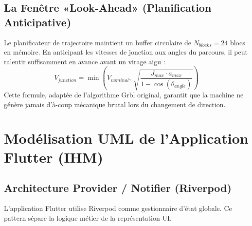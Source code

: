 \subsection{La Fenêtre «Look-Ahead» (Planification Anticipative)}
Le planificateur de trajectoire maintient un buffer circulaire de $N_{blocks} = 24$ blocs en mémoire. En anticipant les vitesses de jonction aux angles du parcours, il peut ralentir suffisamment en avance avant un virage aigu :
\begin{equation}
    V_{junction} = \min\left(V_{nominal},\, \sqrt{\frac{J_{max} \cdot a_{max}}{1 - \cos(\theta_{angle})}}\right)
\end{equation}
Cette formule, adaptée de l'algorithme Grbl original, garantit que la machine ne génère jamais d'à-coup mécanique brutal lors du changement de direction.

\section{Modélisation UML de l'Application Flutter (IHM)}

\subsection{Architecture Provider / Notifier (Riverpod)}
L'application Flutter utilise Riverpod comme gestionnaire d'état globale. Ce pattern sépare la logique métier de la représentation UI.

